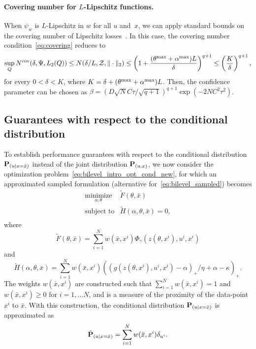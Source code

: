 \documentclass[11pt]{article}
\newcommand{\bsnote}[1]{\noindent\textcolor{red}{\texttt{Bartolomeo: #1}}}
\begin{document}
\paragraph{Covering number for $L$-Lipschitz functions.} When $\psi_{w}$ is $L$-Lipschitz in $w$ for all $u$ and~$x$,
we can apply standard bounds on the covering number of Lipschitz losses~\citep{empirical,covering,covering2}.
In this case, the covering number condition~\eqref{eq:covering} reduces to
\begin{equation*}
\sup_Q N^{\text{cov}}(\delta,\Psi,L_2(Q)) \leq N(\delta/L,\mathcal{Z},\|\cdot\|_2) \leq  \left (1 + \frac{(\theta^{\rm max} +\alpha^{\rm max})L}{\delta}\right )^{q+1} \leq \left (\frac{K}{\delta}\right )^{q+1},
\end{equation*} 
for every $0 < \delta < K$, where $K = \delta + (\theta^{\rm max} +\alpha^{\rm max})L$.
Then, the confidence parameter can be chosen as $\beta =  (D\sqrt{N}C\tau/\sqrt{q+1})^{q+1}\exp(-2NC^2\tau^2)$.


\subsection{Guarantees with respect to the conditional distribution}
\label{sec:cond_guarantee}
To establish performance guarantees with respect to the conditional distribution ${\mathbf P}_{(u|x = \bar{x})}$ instead of the joint distribution ${\mathbf P}_{(u,x)}$, we now consider the optimization problem~\eqref{eq:bilevel_intro_opt_cond_new},
for which an approximated sampled formulation (alternative for~\eqref{eq:bilevel_sampled}) becomes
\begin{equation}
	\label{eq:bilevel_sampled_cond}
	\begin{array}{ll}
		\underset{\alpha,\theta}{\mbox{minimize}} & \tilde{F}(\theta,\bar{x}) \\
		\mbox{subject to} & \tilde{H}(\alpha,\theta,\bar{x}) = 0,\\
	\end{array}
\end{equation}
where
$$\tilde{F}(\theta,\bar{x}) = \sum_{i=1}^N w(\bar{x},x^i)\Phi_{\gamma}(z(\theta,x^i),u^i, x^i)$$
and 
 $$\tilde{H}(\alpha,\theta,\bar{x}) = \sum_{i=1}^N w(\bar{x},x^i)((g(z(\theta,x^i),u^i,x^i)- \alpha)_+/\eta + \alpha - \kappa)_+.$$
The weights $w(\bar{x},x^i)$ are constructed such that $\sum_{i=1}^Nw(\bar{x},x^i) = 1$ and $w(\bar{x},x^i) \geq 0$ for $i = 1,\dots N$, and is a measure of the proximity of the data-point $x^i$ to $\bar{x}$. With this construction, the conditional distribution ${\mathbf P}_{(u|x = \bar{x})}$ is approximated as
$$\tilde{{\mathbf P}}_{(u|x = \bar{x})} = \sum_{i=1}^Nw(\bar{x},x^i)\delta_{u^i}.$$
\end{document}
